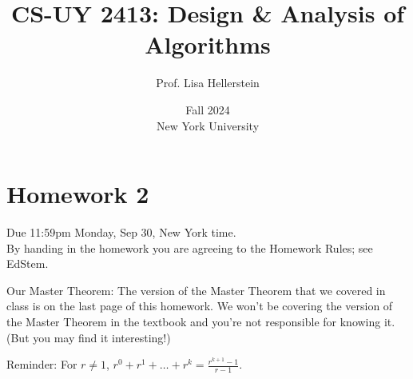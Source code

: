 \documentclass{article}
\begin{document}
\title{CS-UY 2413: Design \& Analysis of Algorithms}
\author{Prof. Lisa Hellerstein}
\date{Fall 2024 \\ New York University}

\maketitle

\section*{Homework 2}
Due 11:59pm Monday, Sep 30, New York time. \\
By handing in the homework you are agreeing to the Homework Rules; see EdStem.

Our Master Theorem: The version of the Master Theorem that we covered in class is on the last page of this homework. We won’t be covering the version of the Master Theorem in the textbook and you’re not responsible for knowing it. (But you may find it interesting!)

Reminder: For $r \neq 1$, $r^0 + r^1 + \dots + r^k = \frac{r^{k+1}-1}{r-1}$.
\end{document}
